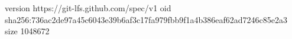 version https://git-lfs.github.com/spec/v1
oid sha256:736ac2de97a45c6043e39b6af3c17fa979fbb9f1a4b386eaf62ad7246c85e2a3
size 1048672
